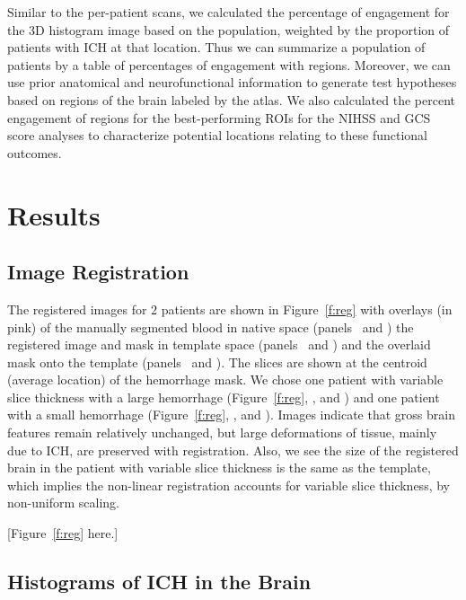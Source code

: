 \documentclass[10pt]{article}\usepackage[]{graphicx}\usepackage[]{color}
\begin{document}
Similar to the per-patient scans, we calculated the percentage of engagement for the 3D histogram image based on the population, weighted by the proportion of patients with ICH at that location.  
Thus we can summarize a population of patients by a table of percentages of engagement with regions.  Moreover, we can use prior anatomical and neurofunctional information to generate test hypotheses based on regions of the brain labeled by the atlas.  We also calculated the percent engagement of regions for the best-performing ROIs for the NIHSS and GCS score analyses to characterize potential locations relating to these functional outcomes.  



\section*{Results}


\subsection*{Image Registration}

The registered images for $2$ patients are shown in Figure~\ref{f:reg} with overlays (in pink) of the manually segmented blood in native space (panels~\protect{} and \protect{}) the registered image and mask in template space (panels~\protect{} and \protect{}) and the overlaid mask onto the template (panels~\protect{} and \protect{}).  The slices are shown at the centroid (average location) of the hemorrhage mask.  We chose one patient with variable slice thickness with a large hemorrhage (Figure~\ref{f:reg}\protect{}, \protect{}, and \protect{}) and one patient with a small hemorrhage (Figure~\ref{f:reg}\protect{}, \protect{}, and \protect{}).  Images indicate that gross brain features remain relatively unchanged, but large deformations of tissue, mainly due to ICH, are preserved with registration.  Also, we see the size of the registered brain in the patient with variable slice thickness is the same as the template, which implies the non-linear registration accounts for variable slice thickness, by non-uniform scaling.

[Figure~\ref{f:reg} here.]


\subsection*{Histograms of ICH in the Brain}
\end{document}
